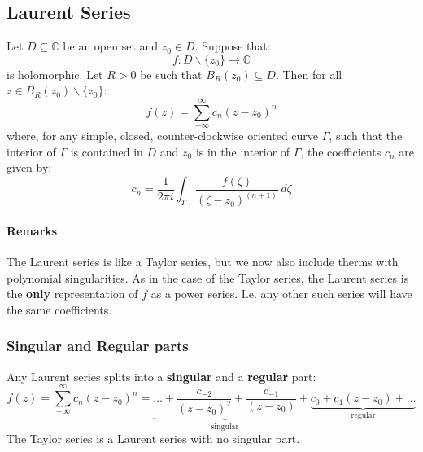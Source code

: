 \subsection{Laurent Series}
Let $D\subseteq \mathbb C$ be an open set and $z_0\in D$. Suppose that:
\begin{equation*}
	f:D\backslash \{z_0\}\to\mathbb C
\end{equation*}
is holomorphic. Let $R > 0$ be such that $B_R(z_0)\subseteq D$. Then for all $z\in  B_R(z_0)\backslash\{z_0\}$:
\begin{equation}
	\boxed{f(z) = \sum_{-\infty}^\infty c_n(z-z_0)^n}
\end{equation}
where, for any simple, closed, counter-clockwise oriented curve $\Gamma$, such that the interior of $\Gamma$ is contained in $D$ and $z_0$ is in the interior of $\Gamma$, the coefficients $c_n$ are given by:
\begin{equation*}
	c_n = \frac 1{2\pi i} \int_ \Gamma\frac{f(\zeta)}{(\zeta - z_0)^{(n+1)}}\,d \zeta
\end{equation*}

\paragraph{Remarks} The Laurent series is like a Taylor series, but we now also include therms with polynomial singularities. As in the case of the Taylor series, the Laurent series is the \textbf{only} representation of $f$ as a power series. I.e. any other such series will have the same coefficients.

\subsubsection{Singular and Regular parts}
Any Laurent series splits into a \textbf{singular} and a \textbf{regular} part:
\begin{equation*}
	f(z) = \sum_{-\infty}^\infty c_n (z-z_0) ^n = \underbrace{\dots + \frac{c_{-2}}{(z-z_0)^2}+\frac{c_{-1}}{(z-z_0)}}_{\text{singular}} + \underbrace{c_0 + c_1(z-z_0) + \dots}_{\text{regular}}
\end{equation*}
The Taylor series is a Laurent series with no singular part.

